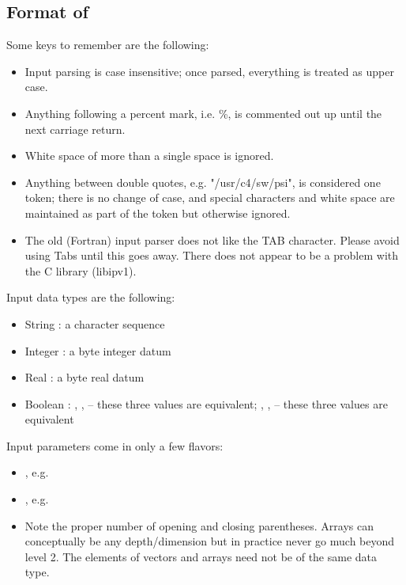 \subsection{Format of }
Some keys to remember are the following: 
\begin{itemize}
\item Input parsing is case insensitive; once parsed, everything is treated as upper case. 
\item Anything following a percent mark, i.e. \%, is commented out up until the next carriage return. 
\item White space of more than a single space is ignored. 
\item Anything between double quotes, e.g. "/usr/c4/sw/psi", 
is considered one token; there is no change of case, and special 
characters and white space are maintained as part of the token 
but  otherwise ignored. 
\item The old (Fortran) input parser does not like the TAB character.
Please avoid using Tabs until this goes away.  There does not appear
to be a problem with the C library (libipv1).
\end{itemize}
Input data types are the following: 
\begin{itemize}
\item String : a character sequence 
\item Integer : a  byte integer datum 
\item Real : a  byte real datum 
\item Boolean : , ,  -- these three values are equivalent;
, ,  -- these three values are equivalent 
\end{itemize}
Input parameters come in only a few flavors: 
\begin{itemize}
\item {}, e.g.  
\item {}, e.g. 
\item {}
Note the proper number of opening and closing parentheses. Arrays can 
conceptually be any depth/dimension but in practice never go
much beyond level 2. The elements of vectors and arrays 
need not be of the same data type. 
\end{itemize}

